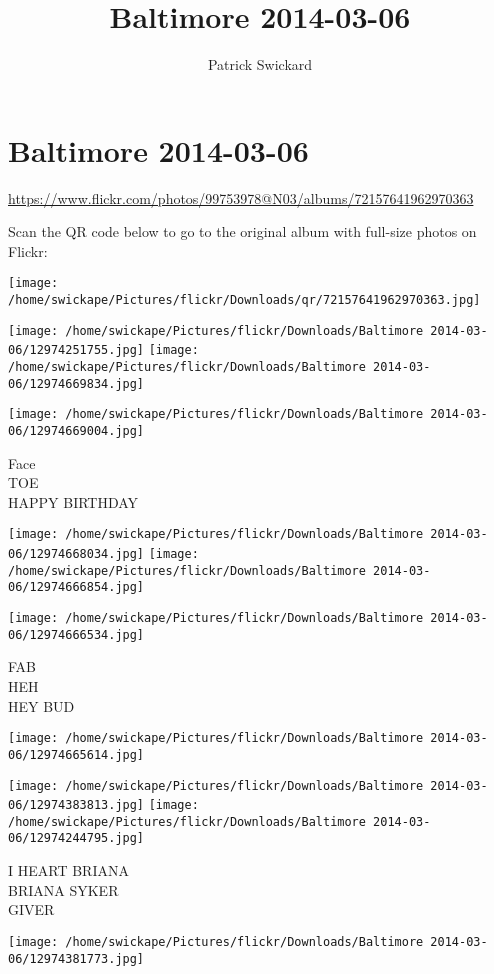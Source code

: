 \documentclass[10pt,letterpaper]{article}
\title{Baltimore 2014-03-06}
\author{Patrick Swickard}
\date{}
\begin{document}
\section*{Baltimore 2014-03-06}

\url{https://www.flickr.com/photos/99753978@N03/albums/72157641962970363}

Scan the QR code below to go to the original album with full-size photos on Flickr:

\texttt{[image: /home/swickape/Pictures/flickr/Downloads/qr/72157641962970363.jpg]}
\pagebreak

\texttt{[image: /home/swickape/Pictures/flickr/Downloads/Baltimore 2014-03-06/12974251755.jpg]}
\texttt{[image: /home/swickape/Pictures/flickr/Downloads/Baltimore 2014-03-06/12974669834.jpg]}

\vspace{0.25in}
\texttt{[image: /home/swickape/Pictures/flickr/Downloads/Baltimore 2014-03-06/12974669004.jpg]}

Face\\
TOE\\
HAPPY BIRTHDAY
\pagebreak

\texttt{[image: /home/swickape/Pictures/flickr/Downloads/Baltimore 2014-03-06/12974668034.jpg]}
\texttt{[image: /home/swickape/Pictures/flickr/Downloads/Baltimore 2014-03-06/12974666854.jpg]}

\texttt{[image: /home/swickape/Pictures/flickr/Downloads/Baltimore 2014-03-06/12974666534.jpg]}

FAB\\
HEH\\
HEY BUD
\pagebreak

\texttt{[image: /home/swickape/Pictures/flickr/Downloads/Baltimore 2014-03-06/12974665614.jpg]}

\vspace{0.25in}
\texttt{[image: /home/swickape/Pictures/flickr/Downloads/Baltimore 2014-03-06/12974383813.jpg]}
\texttt{[image: /home/swickape/Pictures/flickr/Downloads/Baltimore 2014-03-06/12974244795.jpg]}

I HEART BRIANA\\
BRIANA SYKER\\
GIVER
\pagebreak

\texttt{[image: /home/swickape/Pictures/flickr/Downloads/Baltimore 2014-03-06/12974381773.jpg]}
\end{document}
